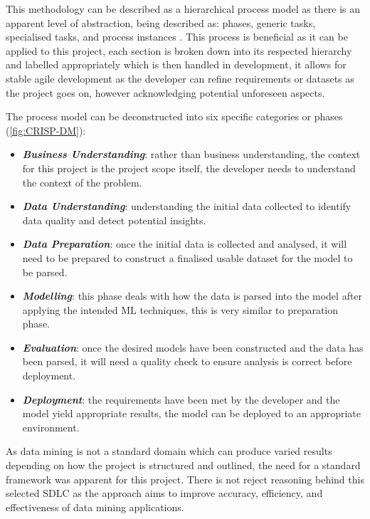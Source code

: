 This methodology can be described as a hierarchical process model as there is an apparent level of abstraction, being described as: phases, generic tasks, specialised tasks, and process instances \parencite{wirth2000crisp}. This process is beneficial as it can be applied to this project, each section is broken down into its respected hierarchy and labelled appropriately which is then handled in development, it allows for stable agile development as the developer can refine requirements or datasets as the project goes on, however acknowledging potential unforeseen aspects.

The process model can be deconstructed into six specific categories or phases (\autoref{fig:CRISP-DM}):

\begin{itemize}
    \item \textbf{\textit{Business Understanding}}: rather than business understanding, the context for this project is the project scope itself, the developer needs to understand the context of the problem.
    \item \textbf{\textit{Data Understanding}}: understanding the initial data collected to identify data quality and detect potential insights.
    \item \textbf{\textit{Data Preparation}}: once the initial data is collected and analysed, it will need to be prepared to construct a finalised usable dataset for the model to be parsed.
    \item \textbf{\textit{Modelling}}: this phase deals with how the data is parsed into the model after applying the intended ML techniques, this is very similar to preparation phase.
    \item \textbf{\textit{Evaluation}}: once the desired models have been constructed and the data has been parsed, it will need a quality check to ensure analysis is correct before deployment.
    \item \textbf{\textit{Deployment}}: the requirements have been met by the developer and the model yield appropriate results, the model can be deployed to an appropriate environment.
\end{itemize}

As data mining is not a standard domain which can produce varied results depending on how the project is structured and outlined, the need for a standard framework was apparent for this project. There is not reject reasoning behind this selected SDLC as the approach aims to improve accuracy, efficiency, and effectiveness of data mining applications.

